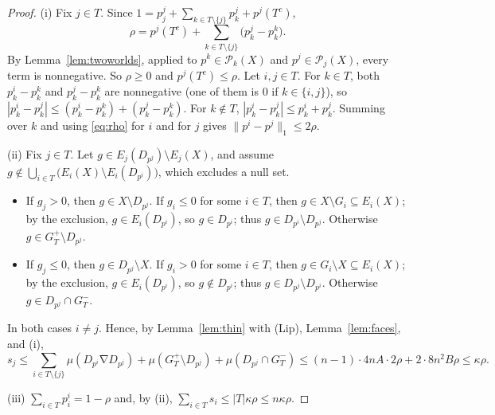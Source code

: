 \documentclass[11pt]{article}
\theoremstyle{definition}
\newcommand{\Pc}{\mathcal P}
\newcommand{\sd}{\mathbin{\nabla}}
\begin{document}
\begin{proof}
(i) Fix $j\in T$. Since $1=p^j_j+\sum_{k\in T\setminus\{j\}}p^j_k+p^j(T^c)$,
\begin{equation}\label{eq:rho}
\rho=p^j(T^c)+\sum_{k\in T\setminus\{j\}}\big(p^j_k-p^k_k\big).
\end{equation}
By Lemma~\ref{lem:twoworlds}, applied to $p^k\in\Pc_k(X)$ and $p^j\in\Pc_j(X)$, every term is nonnegative. So $\rho\ge0$ and $p^j(T^c)\le\rho$. Let $i,j\in T$. For $k\in T$, both $p^i_k-p^k_k$ and $p^j_k-p^k_k$ are nonnegative (one of them is $0$ if $k\in\{i,j\}$), so $|p^i_k-p^j_k|\le(p^i_k-p^k_k)+(p^j_k-p^k_k)$. For $k\notin T$, $|p^i_k-p^j_k|\le p^i_k+p^j_k$. Summing over $k$ and using \eqref{eq:rho} for $i$ and for $j$ gives $\|p^i-p^j\|_1\le 2\rho$.

(ii) Fix $j\in T$. Let $g\in E_j(D_{p^j})\setminus E_j(X)$, and assume $g\notin\bigcup_{i\in T}\big(E_i(X)\setminus E_i(D_{p^i})\big)$, which excludes a null set.
\begin{itemize}[itemsep=1pt]
\item If $g_j>0$, then $g\in X\setminus D_{p^j}$. If $g_i\le0$ for some $i\in T$, then $g\in X\setminus G_i\subseteq E_i(X)$; by the exclusion, $g\in E_i(D_{p^i})$, so $g\in D_{p^i}$; thus $g\in D_{p^i}\setminus D_{p^j}$. Otherwise $g\in G_T^+\setminus D_{p^j}$.
\item If $g_j\le0$, then $g\in D_{p^j}\setminus X$. If $g_i>0$ for some $i\in T$, then $g\in G_i\setminus X\subseteq E_i(X)$; by the exclusion, $g\in E_i(D_{p^i})$, so $g\notin D_{p^i}$; thus $g\in D_{p^j}\setminus D_{p^i}$. Otherwise $g\in D_{p^j}\cap G_T^-$.
\end{itemize}
In both cases $i\neq j$. Hence, by Lemma~\ref{lem:thin} with (Lip), Lemma~\ref{lem:faces}, and (i),
\[
s_j\le\sum_{i\in T\setminus\{j\}}\mu(D_{p^i}\sd D_{p^j})+\mu(G_T^+\setminus D_{p^j})+\mu(D_{p^j}\cap G_T^-)
\le(n-1)\cdot 4nA\cdot 2\rho+2\cdot 8n^2B\rho\le\kappa\rho .
\]

(iii) $\sum_{i\in T}p^i_i=1-\rho$ and, by (ii), $\sum_{i\in T}s_i\le|T|\kappa\rho\le n\kappa\rho$.
\end{proof}
\end{document}
